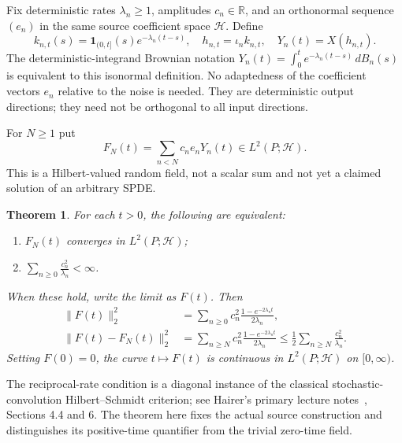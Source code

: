 \documentclass[11pt]{article}
\newtheorem{theorem}{Theorem}[section]
\newcommand{\R}{\mathbb R}\newcommand{\E}{\mathbb E}
\newcommand{\Hh}{\mathcal H}\newcommand{\tr}{\operatorname{tr}}
\begin{document}
Fix deterministic rates $\lambda_n\geq1$, amplitudes $c_n\in\R$,
and an orthonormal sequence $(e_n)$ in the same source coefficient
space $\Hh$. Define
\begin{equation}\label{eq:profiles}
 k_{n,t}(s)=\mathbf1_{(0,t]}(s)e^{-\lambda_n(t-s)},\quad
 h_{n,t}=\iota_nk_{n,t},\quad Y_n(t)=X(h_{n,t}).
\end{equation}
The deterministic-integrand Brownian notation
$Y_n(t)=\int_0^te^{-\lambda_n(t-s)}\,dB_n(s)$ is equivalent to this
isonormal definition. No adaptedness of the coefficient vectors $e_n$
relative to the noise is needed. They are deterministic output
directions; they need not be orthogonal to all input directions.

For $N\geq1$ put
\[
 F_N(t)=\sum_{n<N}c_n e_nY_n(t)\in L^2(P;\Hh).
\]
This is a Hilbert-valued random field, not a scalar sum and not yet a
claimed solution of an arbitrary SPDE.

\begin{theorem}\label{thm:trace}
For each $t>0$, the following are equivalent:
\begin{enumerate}
\item $F_N(t)$ converges in $L^2(P;\Hh)$;
\item $\displaystyle\sum_{n\geq0}\frac{c_n^2}{\lambda_n}<\infty$.
\end{enumerate}
When these hold, write the limit as $F(t)$. Then
\begin{align}
 \|F(t)\|_2^2
 &=\sum_{n\geq0}c_n^2\frac{1-e^{-2\lambda_nt}}{2\lambda_n},
 \label{eq:energy}\\
 \|F(t)-F_N(t)\|_2^2
 &=\sum_{n\geq N}c_n^2\frac{1-e^{-2\lambda_nt}}{2\lambda_n}
 \leq\frac12\sum_{n\geq N}\frac{c_n^2}{\lambda_n}.
 \label{eq:tail}
\end{align}
Setting $F(0)=0$, the curve $t\mapsto F(t)$ is continuous in
$L^2(P;\Hh)$ on $[0,\infty)$.
\end{theorem}

The reciprocal-rate condition is a diagonal instance of the classical
stochastic-convolution Hilbert--Schmidt criterion; see Hairer's
primary lecture notes~\cite{Hairer}, Sections 4.4 and 6. The theorem
here fixes the actual source construction and distinguishes its
positive-time quantifier from the trivial zero-time field.
\end{document}
